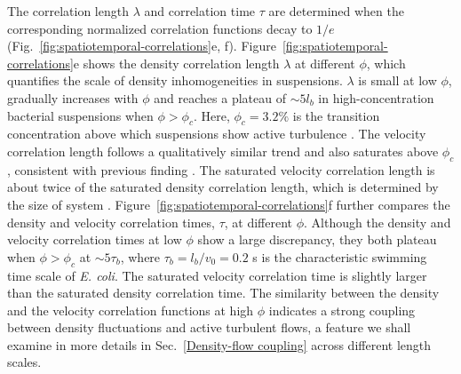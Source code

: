 \documentclass[twocolumn,aps,prx,amsmath,amssymb,longbibliography]{revtex4-2}
\begin{document}
The correlation length $\lambda$ and correlation time $\tau$ are determined when the corresponding normalized correlation functions decay to $1/e$ (Fig.~\ref{fig:spatiotemporal-correlations}e, f). Figure~\ref{fig:spatiotemporal-correlations}e shows the density correlation length $\lambda$ at different $\phi$, which quantifies the scale of density inhomogeneities in suspensions.
$\lambda$ is small at low $\phi$, gradually increases with $\phi$ and reaches a plateau of $\sim 5l_b$ in high-concentration bacterial suspensions when $\phi > \phi_c$. Here, $\phi_c = 3.2\%$ is the transition concentration above which suspensions show active turbulence \cite{Peng2020}.
The velocity correlation length follows a qualitatively similar trend and also saturates above $\phi_c$, consistent with previous finding \cite{Sokolov2007}. The saturated velocity correlation length is about twice of the saturated density correlation length, which is determined by the size of system \cite{Guo2018}.  Figure~\ref{fig:spatiotemporal-correlations}f further compares the density and velocity correlation times, $\tau$, at different $\phi$. Although the density and velocity correlation times at low $\phi$ show a large discrepancy, they both plateau when $\phi > \phi_c$ at $\sim 5\tau_b$, where $\tau_b=l_b/v_0=0.2$ s is the characteristic swimming time scale of \textit{E. coli}. The saturated velocity correlation time is slightly larger than the saturated density correlation time. The similarity between the density and the velocity correlation functions at high $\phi$ indicates a strong coupling between density fluctuations and active turbulent flows, a feature we shall
examine in more details in Sec.~\ref{Density-flow coupling} across different length scales.
\end{document}
